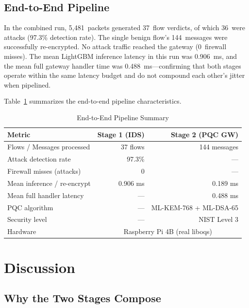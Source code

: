 \documentclass[conference]{IEEEtran}
\begin{document}
\subsection{End-to-End Pipeline}

In the combined run, 5,481~packets generated 37~flow verdicts, of which 36~were attacks (97.3\% detection rate). The single benign flow's 144~messages were successfully re-encrypted. No attack traffic reached the gateway (0~firewall misses). The mean LightGBM inference latency in this run was 0.906~ms, and the mean full gateway handler time was 0.488~ms---confirming that both stages operate within the same latency budget and do not compound each other's jitter when pipelined.

Table~\ref{tab:e2e} summarizes the end-to-end pipeline characteristics.

\begin{table}[!t]
\centering
\captionsetup{font=footnotesize, skip=2pt}
\caption{End-to-End Pipeline Summary}
\label{tab:e2e}
\footnotesize
\setlength{\tabcolsep}{4pt}
\begin{tabular}{lrr}
\toprule
\textbf{Metric} & \textbf{Stage 1 (IDS)} & \textbf{Stage 2 (PQC GW)} \\
\midrule
Flows / Messages processed    & 37 flows       & 144 messages \\
Attack detection rate         & 97.3\%          & — \\
Firewall misses (attacks)     & 0              & — \\
Mean inference / re-encrypt   & 0.906 ms       & 0.189 ms \\
Mean full handler latency     & —              & 0.488 ms \\
PQC algorithm                 & —              & ML-KEM-768 + ML-DSA-65 \\
Security level                & —              & NIST Level 3 \\
Hardware                      & \multicolumn{2}{c}{Raspberry Pi 4B (real liboqs)} \\
\bottomrule
\end{tabular}
\vspace{-4mm}
\end{table}

\section{Discussion}

\subsection{Why the Two Stages Compose}
\end{document}
